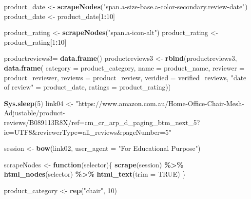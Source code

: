 \documentclass[
]{article}
\newenvironment{Shaded}{\begin{snugshade}}{\end{snugshade}}
\newcommand{\AttributeTok}[1]{\textcolor[rgb]{0.13,0.29,0.53}{#1}}
\newcommand{\ConstantTok}[1]{\textcolor[rgb]{0.56,0.35,0.01}{#1}}
\newcommand{\ControlFlowTok}[1]{\textcolor[rgb]{0.13,0.29,0.53}{\textbf{#1}}}
\newcommand{\DecValTok}[1]{\textcolor[rgb]{0.00,0.00,0.81}{#1}}
\newcommand{\FunctionTok}[1]{\textcolor[rgb]{0.13,0.29,0.53}{\textbf{#1}}}
\newcommand{\NormalTok}[1]{#1}
\newcommand{\OtherTok}[1]{\textcolor[rgb]{0.56,0.35,0.01}{#1}}
\newcommand{\SpecialCharTok}[1]{\textcolor[rgb]{0.81,0.36,0.00}{\textbf{#1}}}
\newcommand{\StringTok}[1]{\textcolor[rgb]{0.31,0.60,0.02}{#1}}
\begin{document}
\begin{Shaded}
\begin{Highlighting}[]
\NormalTok{  product\_date }\OtherTok{\textless{}{-}} \FunctionTok{scrapeNodes}\NormalTok{(}\StringTok{"span.a{-}size{-}base.a{-}color{-}secondary.review{-}date"}\NormalTok{)}
\NormalTok{  product\_date }\OtherTok{\textless{}{-}}\NormalTok{ product\_date[}\DecValTok{1}\SpecialCharTok{:}\DecValTok{10}\NormalTok{]}
  
\NormalTok{  product\_rating }\OtherTok{\textless{}{-}} \FunctionTok{scrapeNodes}\NormalTok{(}\StringTok{"span.a{-}icon{-}alt"}\NormalTok{)}
\NormalTok{  product\_rating }\OtherTok{\textless{}{-}}\NormalTok{ product\_rating[}\DecValTok{1}\SpecialCharTok{:}\DecValTok{10}\NormalTok{]}
  
\NormalTok{  productreviews3}\OtherTok{=} \FunctionTok{data.frame}\NormalTok{()}
\NormalTok{  productreviews3 }\OtherTok{\textless{}{-}} \FunctionTok{rbind}\NormalTok{(productreviews3, }\FunctionTok{data.frame}\NormalTok{(}
                      \AttributeTok{category =}\NormalTok{ product\_category,}
                      \AttributeTok{name =}\NormalTok{ product\_name,}
                      \AttributeTok{reviewer =}\NormalTok{ product\_reviewer,}
                      \AttributeTok{reviews =}\NormalTok{ product\_review,}
                      \AttributeTok{veridied =}\NormalTok{ verified\_reviews,}
                      \StringTok{"date of review"} \OtherTok{=}\NormalTok{ product\_date,}
                      \AttributeTok{ratings =}\NormalTok{ product\_rating))}
  
   \FunctionTok{Sys.sleep}\NormalTok{(}\DecValTok{5}\NormalTok{)}
\NormalTok{link04 }\OtherTok{\textless{}{-}} \StringTok{"https://www.amazon.com.au/Home{-}Office{-}Chair{-}Mesh{-}Adjustable/product{-}reviews/B089113R8X/ref=cm\_cr\_arp\_d\_paging\_btm\_next\_5?ie=UTF8\&reviewerType=all\_reviews\&pageNumber=5"}


\NormalTok{  session }\OtherTok{\textless{}{-}} \FunctionTok{bow}\NormalTok{(link02,}
               \AttributeTok{user\_agent =} \StringTok{"For Educational Purpose"}\NormalTok{)}

\NormalTok{  scrapeNodes }\OtherTok{\textless{}{-}} \ControlFlowTok{function}\NormalTok{(selector)\{}
    \FunctionTok{scrape}\NormalTok{(session) }\SpecialCharTok{\%\textgreater{}\%}
      \FunctionTok{html\_nodes}\NormalTok{(selector) }\SpecialCharTok{\%\textgreater{}\%}
      \FunctionTok{html\_text}\NormalTok{(}\AttributeTok{trim =} \ConstantTok{TRUE}\NormalTok{)}
\NormalTok{  \}}

\NormalTok{  product\_category }\OtherTok{\textless{}{-}} \FunctionTok{rep}\NormalTok{(}\StringTok{"chair"}\NormalTok{, }\DecValTok{10}\NormalTok{)}


\end{Highlighting}
\end{Shaded}
\end{document}
